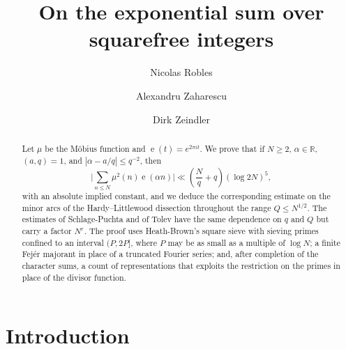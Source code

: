 \documentclass[11pt]{amsart}
\numberwithin{equation}{section}
\numberwithin{figure}{section}
\theoremstyle{definition}
\newcommand{\R}{\mathbb{R}}
\newcommand{\e}{\operatorname{e}}
\newcommand{\eps}{\varepsilon}
\begin{document}
\title[Exponential sum over squarefree integers]{On the exponential sum over squarefree integers}

\author[N.~Robles]{Nicolas Robles}
\address{Nicolas Robles: RAND Corporation, Engineering and Applied Sciences,
1200 S Hayes, Arlington, VA 22202, USA}

\author[A.~Zaharescu]{Alexandru Zaharescu}
\address{Alexandru Zaharescu: Department of Mathematics, University of
Illinois Urbana-Champaign, Altgeld Hall, 1409 W. Green Street, Urbana, IL,
61801, USA}

\author[D.~Zeindler]{Dirk Zeindler}
\address{
Dirk Zeindler: Department of Mathematics and Statistics, Lancaster University, Fylde College, Bailrigg, Lancaster LA1 4YF, United Kingdom}

\begin{abstract}
Let $\mu$ be the M\"obius function and $\e(t)=e^{2\pi it}$.  We prove
that if $N\ge2$, $\alpha\in\R$, $(a,q)=1$, and $|\alpha-a/q|\le q^{-2}$,
then
\[
  \bigg|\sum_{n\le N}\mu^2(n)\e(\alpha n)\bigg|\ll\left(\frac Nq+q\right)(\log 2N)^5,
\]
with an absolute implied constant, and we deduce the corresponding
estimate on the minor arcs of the Hardy--Littlewood dissection throughout
the range $Q\le N^{1/2}$.  The estimates of Schlage-Puchta \cite{SP} and
of Tolev \cite{Tolev} have the same dependence on $q$ and $Q$ but carry a
factor $N^{\eps}$.  The proof uses Heath-Brown's square sieve with sieving primes confined to
an interval $(P,2P]$, where $P$ may be as small as a multiple of $\log N$;
a finite Fej\'er majorant in place of a truncated Fourier series; and,
after completion of the character sums, a count of representations that
exploits the restriction on the primes in place of the divisor function.
\end{abstract}

\maketitle

\section{Introduction}
\end{document}
